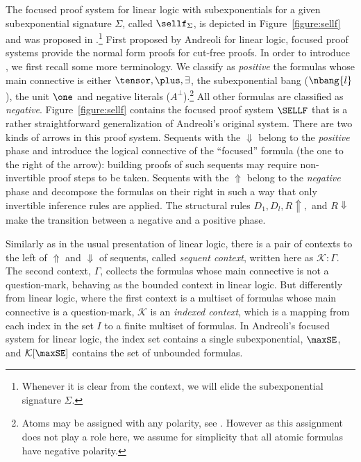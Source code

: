  The focused proof system for linear logic with
subexponentials for a given subexponential signature
$\Sigma$, called $\sellf_\Sigma$, is
depicted in Figure~\ref{figure:sellf}
and was proposed in \cite{nigam09ppdp}.\footnote{Whenever it is clear from
the context, we will elide the
subexponential signature
$\Sigma$.}
First proposed by Andreoli \cite{andreoli92jlc} for linear logic,
focused proof systems provide the normal form proofs for cut-free proofs.
In order to introduce \SELLF, we first recall some more terminology. 
We classify as
\emph{positive} the formulas whose main connective is either $\tensor,
\plus, \exists$, the subexponential bang ($\nbang{l}$), the unit $\one$ and
negative literals ($A^\bot$).\footnote{Atoms may be assigned with any
polarity, see \cite{andreoli92jlc,nigam10jar}. However as this assignment
does not play a role here, we assume for simplicity that all atomic
formulas have negative polarity.} All other formulas are classified as
\emph{negative}. Figure~\ref{figure:sellf} contains the focused proof
system $\SELLF$ that
is a rather straightforward generalization of Andreoli's original
system. There are two kinds of arrows in this proof system. Sequents
with the $\Downarrow$ belong to the \emph{positive} phase and introduce
the logical connective of the ``focused'' formula (the one to the right
of the arrow): building proofs of such sequents may require
non-invertible proof steps to be taken.  Sequents with the $\Uparrow$
belong to the \emph{negative} phase and 
decompose the formulas on their right in such a way that only
invertible inference rules are applied. The structural 
rules $D_1, D_l, R\Uparrow,$ and
$R \Downarrow$ make the transition between a negative and a positive
phase. 

Similarly as in the usual presentation of linear logic, there is a pair
of contexts to the left of $\Uparrow$ and $\Downarrow$ of
sequents, called \emph{sequent context}, written here as $\mathcal{K}:
\Gamma$. 
The second context, $\Gamma$, collects the formulas whose main
connective is not a question-mark, behaving as the bounded context
in linear logic. But differently from linear logic, where the first
context is a multiset of formulas whose main connective is a
question-mark, $\mathcal{K}$ is an \emph{indexed context}, which is a
mapping from each index in the set $I$ to a finite multiset of formulas. In
Andreoli's focused system for linear
logic, the index set contains a single subexponential, $\maxSE$, and
$\mathcal{K}[\maxSE]$ contains the set of unbounded formulas.


